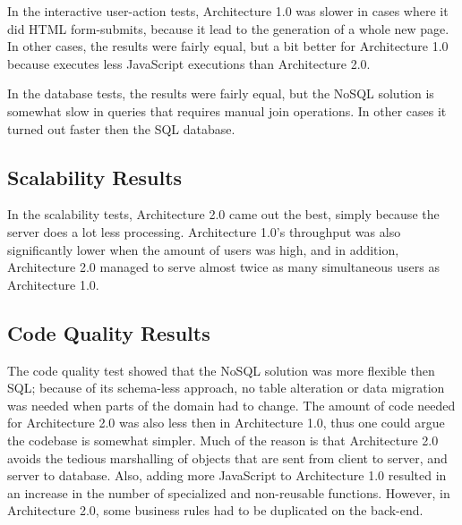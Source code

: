In the interactive user-action tests, Architecture 1.0 was slower in cases where it did HTML form-submits, because it lead to the generation of a whole new page. In other cases, the results were fairly equal, but a bit better for Architecture 1.0 because executes less JavaScript executions than Architecture 2.0.

In the database tests, the results were fairly equal, but the NoSQL solution is somewhat slow in queries that requires manual join operations. In other cases it turned out faster then the SQL database.


\subsection{Scalability Results}
In the scalability tests, Architecture 2.0 came out the best, simply because the server does a lot less processing. Architecture 1.0's throughput was also significantly lower when the amount of users was high, and in addition, Architecture 2.0 managed to serve almost twice as many simultaneous users as Architecture 1.0. 

\subsection{Code Quality Results}
The code quality test showed that the NoSQL solution was more flexible then SQL; because of its schema-less approach, no table alteration or data migration was needed when parts of the domain had to change. The amount of code needed for Architecture 2.0 was also less then in Architecture 1.0, thus one could argue the codebase is somewhat simpler. Much of the reason is that Architecture 2.0 avoids the tedious marshalling of objects that are sent from client to server, and server to database. Also, adding more JavaScript to Architecture 1.0 resulted in an increase in the number of specialized and non-reusable functions. However, in Architecture 2.0, some business rules had to be duplicated on the back-end.





